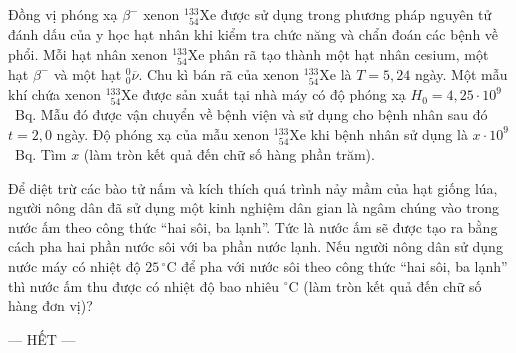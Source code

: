 	\begin{ex}%
		Đồng vị phóng xạ $\beta^-$ xenon $^{133}_{\phantom{1}54}\text{Xe}$ được sử dụng trong phương pháp nguyên tử đánh dấu của y học hạt nhân khi kiểm tra chức năng và chẩn đoán các bệnh về phổi. Mỗi hạt nhân xenon $^{133}_{\phantom{1}54}\text{Xe}$ phân rã tạo thành một hạt nhân cesium, một hạt $\beta^-$ và một hạt ${}^0_0\overline{\nu}$. Chu kì bán rã của xenon $^{133}_{\phantom{1}54}\text{Xe}$ là $T=5{,}24$ ngày. Một mẫu khí chứa xenon $^{133}_{\phantom{1}54}\text{Xe}$ được sản xuất tại nhà máy có độ phóng xạ $H_0=4{,}25\cdot 10^9$~Bq. Mẫu đó được vận chuyển về bệnh viện và sử dụng cho bệnh nhân sau đó $t=2{,}0$ ngày. Độ phóng xạ của mẫu xenon $^{133}_{\phantom{1}54}\text{Xe}$ khi bệnh nhân sử dụng là $x\cdot 10^9$~Bq. Tìm $x$ (làm tròn kết quả đến chữ số hàng phần trăm).
		\par
	\end{ex}

	\begin{ex}%
		Để diệt trừ các bào tử nấm và kích thích quá trình nảy mầm của hạt giống lúa, người nông dân đã sử dụng một kinh nghiệm dân gian là ngâm chúng vào trong nước ấm theo công thức ``hai sôi, ba lạnh''. Tức là nước ấm sẽ được tạo ra bằng cách pha hai phần nước sôi với ba phần nước lạnh. Nếu người nông dân sử dụng nước máy có nhiệt độ $25\,^\circ\text{C}$ để pha với nước sôi theo công thức ``hai sôi, ba lạnh'' thì nước ấm thu được có nhiệt độ bao nhiêu $^\circ\text{C}$ (làm tròn kết quả đến chữ số hàng đơn vị)?
		\par
	\end{ex}

	\centerline{--- HẾT ---}



